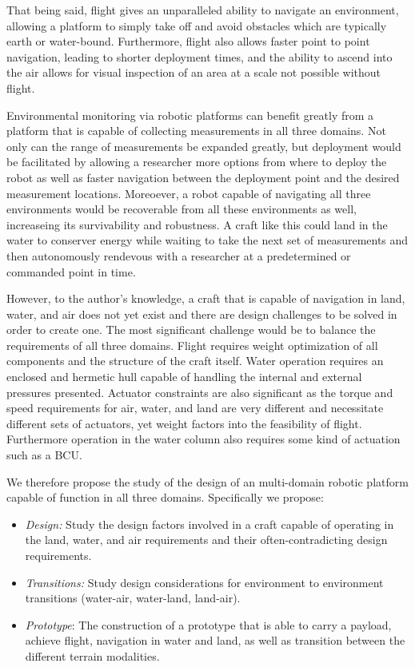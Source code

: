 That being said, flight gives an unparalleled ability to navigate an environment, allowing a platform to simply take off and avoid obstacles which are typically earth or water-bound. Furthermore, flight also allows faster point to point navigation, leading to shorter deployment times, and the ability to ascend into the air allows for visual inspection of an area at a scale not possible without flight. 

Environmental monitoring via robotic platforms can benefit greatly from a platform that is capable of collecting measurements in all three domains. Not only can the range of measurements be expanded greatly, but deployment would be facilitated by allowing a researcher more options from where to deploy the robot as well as faster navigation between the deployment point and the desired measurement locations. Moreoever, a robot capable of navigating all three environments would be recoverable from all these environments as well, increaseing its survivability and robustness. A craft like this could land in the water to conserver energy while waiting to take the next set of measurements and then autonomously rendevous with a researcher at a predetermined or commanded point in time. 

However, to the author's knowledge, a craft that is capable of navigation in land, water, and air does not yet exist and there are design challenges to be solved in order to create one. The most significant challenge would be to balance the requirements of all three domains. Flight requires weight optimization of all components and the structure of the craft itself.  Water operation requires an enclosed and hermetic hull capable of handling the internal and external pressures presented. Actuator constraints are also significant as the torque and speed requirements for air, water, and land are very different and necessitate different sets of actuators, yet weight factors into the feasibility of flight. Furthermore operation in the water column also requires some kind of actuation such as a BCU. 

We therefore propose the study of the design of an multi-domain robotic platform capable of function in all three domains. Specifically we propose:

\begin{itemize}
	\item \emph{Design:} Study the design factors involved in a craft capable of operating in the land, water, and air requirements and their often-contradicting design requirements. 
	\item \emph{Transitions:} Study design considerations for environment to environment transitions (water-air, water-land, land-air). 
	\item \emph{Prototype}: The construction of a prototype that is able to carry a payload, achieve flight, navigation in water and land, as well as transition between the different terrain modalities. 
\end{itemize}



